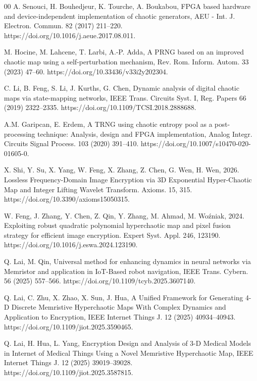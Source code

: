 \documentclass[preprint, 12pt, sort&compress]{elsarticle}
\begin{document}
\begin{thebibliography}{00}
A. Senouci, H. Bouhedjeur, K. Tourche, A. Boukabou, FPGA based hardware and device-independent implementation of chaotic generators, AEU - Int. J. Electron. Commun. 82 (2017) 211–220. https://doi.org/10.1016/j.aeue.2017.08.011.

M. Hocine, M. Lahcene, T. Larbi, A.-P. Adda, A PRNG based on an improved chaotic map using a self-perturbation mechanism, Rev. Rom. Inform. Autom. 33 (2023) 47–60. https://doi.org/10.33436/v33i2y202304.

C. Li, B. Feng, S. Li, J. Kurths, G. Chen, Dynamic analysis of digital chaotic maps via state-mapping networks, IEEE Trans. Circuits Syst. I, Reg. Papers 66 (2019) 2322–2335. https://doi.org/10.1109/TCSI.2018.2888688.

A.M. Garipcan, E. Erdem, A TRNG using chaotic entropy pool as a post-processing technique: Analysis, design and FPGA implementation, Analog Integr. Circuits Signal Process. 103 (2020) 391–410. https://doi.org/10.1007/s10470-020-01605-0.

X. Shi, Y. Su, X. Yang, W. Feng, X. Zhang, Z. Chen, G. Wen, H. Wen, 2026. Lossless Frequency-Domain Image Encryption via 3D Exponential Hyper-Chaotic Map and Integer Lifting Wavelet Transform. Axioms. 15, 315. https://doi.org/10.3390/axioms15050315.

W. Feng, J. Zhang, Y. Chen, Z. Qin, Y. Zhang, M. Ahmad, M. Woźniak, 2024. Exploiting robust quadratic polynomial hyperchaotic map and pixel fusion strategy for efficient image encryption. Expert Syst. Appl. 246, 123190. https://doi.org/10.1016/j.eswa.2024.123190.

Q. Lai, M. Qin, Universal method for enhancing dynamics in neural networks via Memristor and application in IoT-Based robot navigation, IEEE Trans. Cybern. 56 (2025) 557–566. https://doi.org/10.1109/tcyb.2025.3607140.

Q. Lai, C. Zhu, X. Zhao, X. Sun, J. Hua, A Unified Framework for Generating 4-D Discrete Memristive Hyperchaotic Maps With Complex Dynamics and Application to Encryption, IEEE Internet Things J. 12 (2025) 40934–40943. https://doi.org/10.1109/jiot.2025.3590465.

Q. Lai, H. Hua, L. Yang, Encryption Design and Analysis of 3-D Medical Models in Internet of Medical Things Using a Novel Memristive Hyperchaotic Map, IEEE Internet Things J. 12 (2025) 39019–39028. https://doi.org/10.1109/jiot.2025.3587815.


\end{thebibliography}
\end{document}
